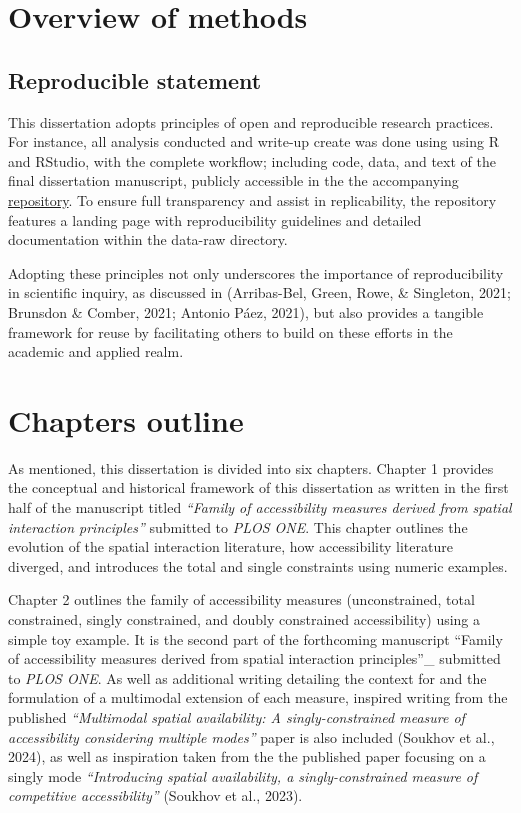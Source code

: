 \documentclass[
11pt, %
oneside, %
english, %
singlespacing, %
]{macthesis} %
\begin{document}
\section{Overview of methods}\label{overview-of-methods}

\subsection{Reproducible statement}\label{reproducible-statement}

This dissertation adopts principles of open and reproducible research practices. For instance, all analysis conducted and write-up create was done using using R and RStudio, with the complete workflow; including code, data, and text of the final dissertation manuscript, publicly accessible in the the accompanying \href{https://github.com/soukhova/Dissertation}{repository}. To ensure full transparency and assist in replicability, the repository features a landing page with reproducibility guidelines and detailed documentation within the data-raw directory.

Adopting these principles not only underscores the importance of reproducibility in scientific inquiry, as discussed in (Arribas-Bel, Green, Rowe, \& Singleton, 2021; Brunsdon \& Comber, 2021; Antonio Páez, 2021), but also provides a tangible framework for reuse by facilitating others to build on these efforts in the academic and applied realm.

\section{Chapters outline}\label{chapters-outline}

As mentioned, this dissertation is divided into six chapters. Chapter 1 provides the conceptual and historical framework of this dissertation as written in the first half of the manuscript titled \emph{``Family of accessibility measures derived from spatial interaction principles''} submitted to \emph{PLOS ONE}. This chapter outlines the evolution of the spatial interaction literature, how accessibility literature diverged, and introduces the total and single constraints using numeric examples.

Chapter 2 outlines the family of accessibility measures (unconstrained, total constrained, singly constrained, and doubly constrained accessibility) using a simple toy example. It is the second part of the forthcoming manuscript ``Family of accessibility measures derived from spatial interaction principles''\_ submitted to \emph{PLOS ONE}. As well as additional writing detailing the context for and the formulation of a multimodal extension of each measure, inspired writing from the published \emph{``Multimodal spatial availability: A singly-constrained measure of accessibility considering multiple modes''} paper is also included (Soukhov et al., 2024), as well as inspiration taken from the the published paper focusing on a singly mode \emph{``Introducing spatial availability, a singly-constrained measure of competitive accessibility''} (Soukhov et al., 2023).
\end{document}
